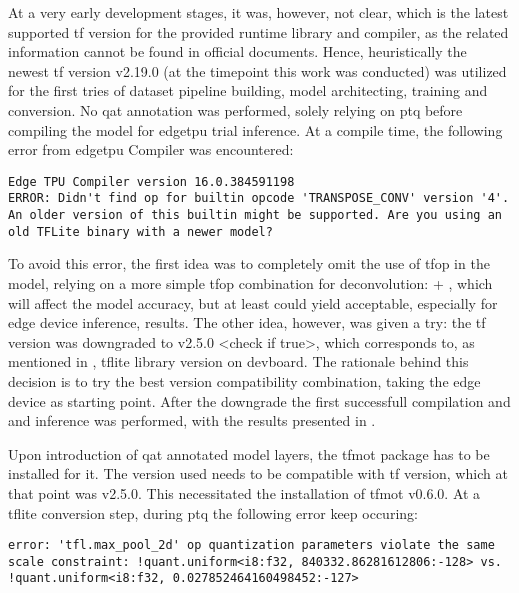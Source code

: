 {

At a very early development stages, it was, however, not clear, which is the latest supported \gls{tf} version for the provided runtime library and compiler,
as the related information cannot be found in official documents.
Hence, heuristically the newest \gls{tf} version v2.19.0 (at the timepoint this work was conducted) was utilized for the first tries of dataset pipeline building,
model architecting, training and conversion. No \gls{qat} annotation was performed, solely relying on \gls{ptq} before compiling the model for \gls{edgetpu} trial inference.
At a compile time, the following error from \gls{edgetpu} Compiler was encountered:

\begin{lstlisting}
Edge TPU Compiler version 16.0.384591198
ERROR: Didn't find op for builtin opcode 'TRANSPOSE_CONV' version '4'. An older version of this builtin might be supported. Are you using an old TFLite binary with a newer model?
\end{lstlisting}

To avoid this error, the first idea was to completely omit the use of  \gls{tfop} in the model, relying on a more simple \gls{tfop} combination for deconvolution:
 + , which will affect the model accuracy, but at least could yield acceptable, especially for edge device inference, results. The other idea, however,
was given a try: the \gls{tf} version was downgraded to v2.5.0 <check if true>, which corresponds to, as mentioned in ,
\gls{tflite} library version on \gls{devboard}. The rationale behind this decision is to try the best version compatibility combination, taking the edge device as starting point.
After the downgrade the first successfull compilation and and inference was performed, with the results presented in .

Upon introduction of \gls{qat} annotated model layers, the \gls{tfmot} package has to be installed for it. The version used needs to be compatible with \gls{tf} version,
which at that point was v2.5.0. This necessitated the installation of \gls{tfmot} v0.6.0. At a \gls{tflite} conversion step, during \gls{ptq} the following error keep occuring:

\begin{lstlisting}
error: 'tfl.max_pool_2d' op quantization parameters violate the same scale constraint: !quant.uniform<i8:f32, 840332.86281612806:-128> vs. !quant.uniform<i8:f32, 0.027852464160498452:-127>
\end{lstlisting}

}
